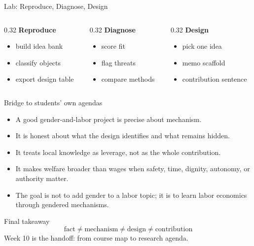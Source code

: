 \documentclass[aspectratio=169,11pt]{beamer}
\begin{document}
\begin{frame}{Lab: Reproduce, Diagnose, Design}
\begin{columns}[T,onlytextwidth]
\begin{column}{0.32\linewidth}
\textbf{Reproduce}
\begin{itemize}
    \item build idea bank
    \item classify objects
    \item export design table
\end{itemize}
\end{column}
\begin{column}{0.32\linewidth}
\textbf{Diagnose}
\begin{itemize}
    \item score fit
    \item flag threats
    \item compare methods
\end{itemize}
\end{column}
\begin{column}{0.32\linewidth}
\textbf{Design}
\begin{itemize}
    \item pick one idea
    \item memo scaffold
    \item contribution sentence
\end{itemize}
\end{column}
\end{columns}
\end{frame}

\begin{frame}{Bridge to students' own agendas}
\begin{itemize}
    \item A good gender-and-labor project is precise about mechanism.
    \item It is honest about what the design identifies and what remains hidden.
    \item It treats local knowledge as leverage, not as the whole contribution.
    \item It makes welfare broader than wages when safety, time, dignity, autonomy, or authority matter.
    \item The goal is not to add gender to a labor topic; it is to learn labor economics through gendered mechanisms.
\end{itemize}
\end{frame}

\begin{frame}{Final takeaway}
\Large
\[
\text{fact} \neq \text{mechanism} \neq \text{design} \neq \text{contribution}
\]
\vspace{0.4cm}
\normalsize
Week 10 is the handoff: from course map to research agenda.
\end{frame}
\end{document}
